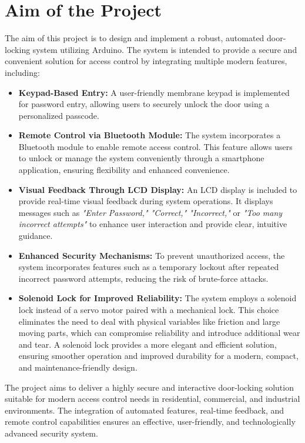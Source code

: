 \documentclass[a4paper, 12pt]{article}
\begin{document}
\section{Aim of the Project}
The aim of this project is to design and implement a robust, automated door-locking system utilizing Arduino. The system is intended to provide a secure and convenient solution for access control by integrating multiple modern features, including:

\begin{itemize}
    \item \textbf{Keypad-Based Entry:} 
    A user-friendly membrane keypad is implemented for password entry, allowing users to securely unlock the door using a personalized passcode.
    
    \item \textbf{Remote Control via Bluetooth Module:} 
    The system incorporates a Bluetooth module to enable remote access control. This feature allows users to unlock or manage the system conveniently through a smartphone application, ensuring flexibility and enhanced convenience.
    
    \item \textbf{Visual Feedback Through LCD Display:} 
    An LCD display is included to provide real-time visual feedback during system operations. It displays messages such as \textit{"Enter Password," "Correct," "Incorrect,"} or \textit{"Too many incorrect attempts"} to enhance user interaction and provide clear, intuitive guidance.
    
    \item \textbf{Enhanced Security Mechanisms:}
    To prevent unauthorized access, the system incorporates features such as a temporary lockout after repeated incorrect password attempts, reducing the risk of brute-force attacks.
    
    \item \textbf{Solenoid Lock for Improved Reliability:} 
    The system employs a solenoid lock instead of a servo motor paired with a mechanical lock. This choice eliminates the need to deal with physical variables like friction and large moving parts, which can compromise reliability and introduce additional wear and tear. A solenoid lock provides a more elegant and efficient solution, ensuring smoother operation and improved durability for a modern, compact, and maintenance-friendly design.
\end{itemize}

The project aims to deliver a highly secure and interactive door-locking solution suitable for modern access control needs in residential, commercial, and industrial environments. The integration of automated features, real-time feedback, and remote control capabilities ensures an effective, user-friendly, and technologically advanced security system.
\end{document}
